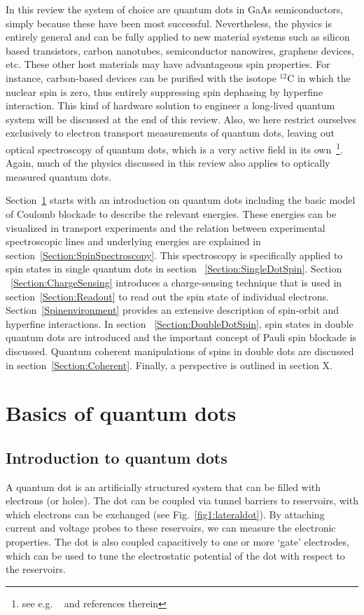 \documentclass[rmp,twocolumn,aps]{revtex4}
\begin{document}
In this review the system of choice are quantum dots in GaAs
semiconductors, simply because these have been most successful.
Nevertheless, the physics is entirely general and can be fully
applied to new material systems such as silicon based transistors,
carbon nanotubes, semiconductor nanowires, graphene devices, etc.
These other host materials may have advantageous spin properties.
For instance, carbon-based devices can be purified with the
isotope $^{12}$C in which the nuclear spin is zero, thus entirely
suppressing spin dephasing by hyperfine interaction. This kind of
hardware solution to engineer a long-lived quantum system will be
discussed at the end of this review.
Also, we here restrict ourselves exclusively to electron transport
measurements of quantum dots, leaving out optical spectroscopy of
quantum dots, which is a very active field in its own~\footnote{see e.g. ~\textcite{greilich06a,AtatureScience2006,KrennerPRL2006,BerezovskyScience2006} and references therein}. Again, much of the physics discussed in this review also applies to optically 
measured quantum dots.

Section~\ref{Section:Basics} starts with an introduction on
quantum dots including the basic model of Coulomb blockade to
describe the relevant energies. These energies can be visualized
in transport experiments and the relation between experimental
spectroscopic lines and underlying energies are explained in
section~\ref{Section:SpinSpectroscopy}. This spectroscopy is
specifically applied to spin states in single quantum dots in
section ~\ref{Section:SingleDotSpin}. Section
~\ref{Section:ChargeSensing} introduces a charge-sensing technique
that is used in section~\ref{Section:Readout} to read out the spin
state of individual electrons. Section~\ref{Spinenvironment}
provides an extensive description of spin-orbit and hyperfine
interactions. In section ~\ref{Section:DoubleDotSpin}, spin states
in double quantum dots are introduced and the important concept of
Pauli spin blockade is discussed. Quantum coherent manipulations
of spins in double dots are discussed in
section~\ref{Section:Coherent}. Finally, a perspective is outlined
in section X.

\section{Basics of quantum dots}
\label{Section:Basics}
\subsection{Introduction to quantum dots}
A quantum dot is an artificially structured system that can be
filled with electrons (or holes). The dot can be coupled via
tunnel barriers to reservoirs, with which electrons can be
exchanged (see Fig.~\ref{fig1:lateraldot}). By attaching current
and voltage probes to these reservoirs, we can measure the
electronic properties. The dot is also coupled capacitively to one
or more `gate' electrodes, which can be used to tune the
electrostatic potential of the dot with respect to the reservoirs.
\end{document}
